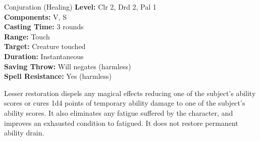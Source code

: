 {Conjuration (Healing)}
{
	\textbf{Level:}
	Clr 2, Drd 2, Pal 1\\
	\textbf{Components:}
	V, S\\
	\textbf{Casting Time:}
	3 rounds\\
	\textbf{Range:}
	Touch\\
	\textbf{Target:}
	Creature touched\\
	\textbf{Duration:}
	Instantaneous\\
	\textbf{Saving Throw:}
	Will negates (harmless)\\
	\textbf{Spell Resistance:}
	Yes (harmless)\\
}
{
	Lesser restoration dispels any magical effects reducing one of the subject's ability scores or cures 1d4 points of temporary ability damage to one of the subject's ability scores. It also eliminates any fatigue suffered by the character, and improves an exhausted condition to fatigued. It does not restore permanent ability drain.

}
